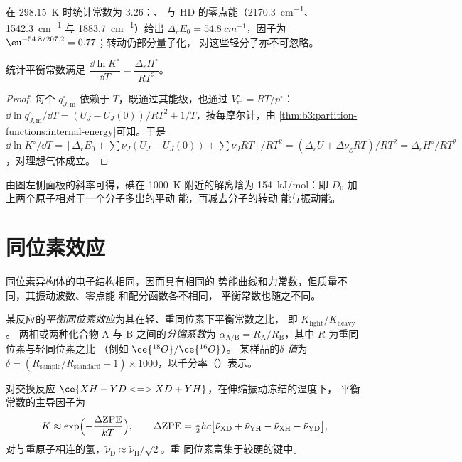 在 \qty{298.15}{K} 时统计常数为 3.26：、
 与 HD 的零点能（\qty{2170.3}{cm^{-1}}、\qty{1542.3}{cm^{-1}} 与 \qty{1883.7}{cm^{-1}}）给出 $\Delta_rE_0 =
\qty{54.8}{cm^{-1}}$，因子为 $\eu^{-54.8/207.2} = 0.77$；转动仍部分量子化，
对这些轻分子亦不可忽略。

\begin{proposition}[范托夫方程的再推导]\label{prop:b3:statistical-thermo-applied:vant-hoff-stat}
统计平衡常数满足 $\dfrac{\dd\ln K^\circ}{\dd T} = \dfrac{\Delta_rH^\circ}{RT^2}$。
\end{proposition}

\begin{proof}
每个 $q^\circ_{J,\mathrm m}$ 依赖于 $T$，既通过其能级，也通过 $V^\circ_{\mathrm m} = RT/p^\circ$：
$\dd\ln q^\circ_{J,\mathrm m}/\dd T = (U_J - U_J(0))/RT^2 + 1/T$，按每摩尔计，由
\cref{thm:b3:partition-functions:internal-energy}可知。于是 $\dd\ln K^\circ/\dd T =
[\Delta_rE_0 + \sum\nu_J(U_J - U_J(0)) + \sum\nu_JRT]/RT^2 = (\Delta_rU + \Delta\nu_{\mathrm g}RT)/RT^2 =
\Delta_rH^\circ/RT^2$，对理想气体成立。
\end{proof}

由图左侧面板的斜率可得，碘在 \qty{1000}{K} 附近的解离焓为
\qty{154}{kJ/mol}：即 $D_0$ 加上两个原子相对于一个分子多出的平动
能，再减去分子的转动
能与振动能。

\section{同位素效应}

同位素异构体的电子结构相同，因而具有相同的
势能曲线和力常数，但质量不同，其振动波数、零点能
和配分函数各不相同，
平衡常数也随之不同。

\begin{definition}\label{def:b3:statistical-thermo-applied:isotope-effect}
某反应的\emph{平衡同位素效应}为其在轻、重同位素下平衡常数之比，
即 $K_{\mathrm{light}}/K_{\mathrm{heavy}}$。
两相或两种化合物 A 与 B 之间的\emph{分馏系数}为
$\alpha_{\mathrm{A/B}} = R_{\mathrm A}/R_{\mathrm B}$，其中 $R$ 为重同位素与轻同位素之比
（例如 $\ce{^{18}O}/\ce{^{16}O}$）。
某样品的\emph{$\delta$ 值}为 $\delta = (R_{\mathrm{sample}}/R_{\mathrm{standard}}
- 1) \times 1000$，以千分率（\textperthousand）表示。
\end{definition}

\begin{proposition}[由零点能导出的同位素效应]\label{prop:b3:statistical-thermo-applied:zpe-isotope}
对交换反应 $\ce{XH + YD <=> XD + YH}$，在伸缩振动冻结的温度下，
平衡常数的主导因子为
\[
  K \approx \exp\Bigl(-\frac{\Delta\mathrm{ZPE}}{kT}\Bigr), \qquad
  \Delta\mathrm{ZPE} = \tfrac12hc\bigl[\tilde\nu_{\mathrm{XD}} + \tilde\nu_{\mathrm{YH}} - \tilde\nu_{\mathrm{XH}} - \tilde\nu_{\mathrm{YD}}\bigr],
\]
对与重原子相连的氢，$\tilde\nu_{\mathrm D} \approx \tilde\nu_{\mathrm H}/\sqrt2$。重
同位素富集于较硬的键中。
\end{proposition}

